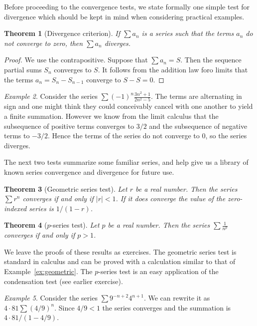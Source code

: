\documentclass[11pt,oneside]{amsbook}
\theoremstyle{definition}
\theoremstyle{plain}
\newtheorem{thm}{Theorem}[section]
\theoremstyle{definition}
\theoremstyle{remark}
\newtheorem{example}[thm]{Example}
\numberwithin{equation}{section}
\numberwithin{figure}{section}
\begin{document}
Before proceeding to the convergence tests, we state formally one simple test for divergence which should be kept in mind when considering practical examples.

\begin{thm}[Divergence criterion]
  If $\sum a_n$ is a series such that the terms $a_n$ do not converge to zero, then $\sum a_n$ diverges.
\end{thm}

\begin{proof}
  We use the contrapositive. Suppose that $\sum a_n=S$. Then the sequence partial sums $S_n$ converges to $S$. It follows from the addition law foro limits that the terms $a_n=S_n-S_{n-1}$ converge to $S-S=0$.
\end{proof}

\begin{example}
  Consider the series $\sum(-1)^n\frac{3n^2+1}{2n^2-5}$. The terms are alternating in sign and one might think they could conceivably cancel with one another to yield a finite summation. However we know from the limit calculus that the subsequence of positive terms converges to $3/2$ and the subsequence of negative terms to $-3/2$. Hence the terms of the series do not converge to $0$, so the series diverges.
\end{example}

The next two tests summarize some familiar series, and help give us a library of known series convergence and divergence for future use.

\begin{thm}[Geometric series test]
  Let $r$ be a real number. Then the series $\sum r^n$ converges if and only if $|r|<1$. If it does converge the value of the zero-indexed series is $1/(1-r)$.
\end{thm}

\begin{thm}[$p$-series test]
  Let $p$ be a real number. Then the series $\sum \frac{1}{n^p}$ converges if and only if $p>1$.
\end{thm}

We leave the proofs of these results as exercises. The geometric series test is standard in calculus and can be proved with a calculation similar to that of Example~\ref{ex:geometric}. The $p$-series test is an easy application of the condensation test (see earlier exercise).

\begin{example}
  Consider the series $\sum 9^{-n+2}4^{n+1}$. We can rewrite it as $4\cdot81\sum(4/9)^n$. Since $4/9<1$ the series converges and the summation is $4\cdot81/(1-4/9)$.
\end{example}
\end{document}
